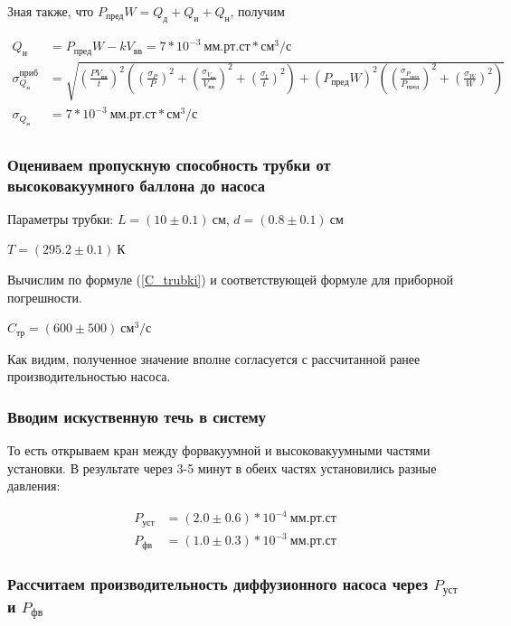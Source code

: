 \documentclass[a4paper, 12pt]{article}
\begin{document}
            Зная также, что $P_{пред}W = Q_д + Q_и + Q_н$, получим

            \begin{align*}
                Q_н &= P_{пред} W - k V_{вв} = 7 * 10^{-3}~мм.рт.ст*см^3/с\\
                \sigma_{Q_н}^{приб} &= \sqrt{ \left( \frac{P V_{вв}}{t} \right)^2 \left( \left( \frac{\sigma_P}{P} \right)^2 + \left( \frac{\sigma_{V_{вв}}}{V_{вв}} \right)^2 + \left( \frac{\sigma_t}{t} \right)^2 \right) + \left( P_{пред} W \right)^2 \left( \left( \frac{\sigma_{P_{пред}}}{P_{пред}} \right)^2 + \left( \frac{\sigma_W}{W} \right)^2 \right)}\\
                \sigma_{Q_н} &= 7 * 10^{-3}~мм.рт.ст*см^3/с\\
            \end{align*}

        \subsubsection{Оцениваем пропускную способность трубки от высоковакуумного баллона до насоса}

            Параметры трубки: $L = (10 \pm 0.1)~см$, $d = (0.8 \pm 0.1)~см$

            $T = (295.2 \pm 0.1)~К$

            Вычислим по формуле (\ref{C_trubki}) и соответствующей формуле для приборной погрешности.

            $C_{тр} = (600 \pm 500)~см^3/с$

            Как видим, полученное значение вполне согласуется с рассчитанной ранее производительностью насоса.

        \subsubsection{Вводим искуственную течь в систему}

            То есть открываем кран между форвакуумной и высоковакуумными частями установки. В результате через 3-5 минут в обеих частях установились разные давления:

            \begin{align*}
                P_{уст} &= (2.0 \pm 0.6)*10^{-4}~мм.рт.ст\\
                P_{фв} &= (1.0 \pm 0.3)*10^{-3}~мм.рт.ст
            \end{align*}

        \subsubsection{Рассчитаем производительность диффузионного насоса через $P_{уст}$ и $P_{фв}$}
\end{document}
